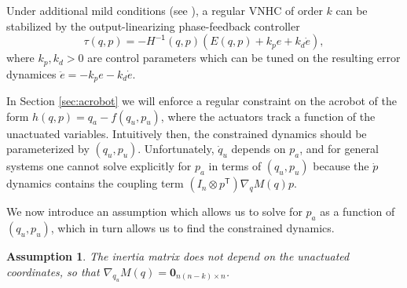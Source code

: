 \documentclass[journal,twoside,web]{ieeecolor}
\newtheorem{assm}{Assumption} %
\newcommand*{\tpose}{^\mathsf{T}}
\newcommand*{\inv}{^\mathsf{-1}}
\newcommand*{\Id}[1]{I_{#1}}
\newcommand*{\Zmat}[1]{\bm{0}_{#1}}
\begin{document}
Under additional mild conditions (see \cite{vhcs_for_el_systems}), a regular VNHC of
order \(k\) can be stabilized by the output-linearizing phase-feedback
controller
\begin{equation}
    \tau(q,p) = -H\inv(q,p)\left(E(q,p) + k_p e + k_d \dot{e}\right)
    ,
\end{equation}
where \(k_p, k_d > 0\) are control parameters which can be tuned on the
resulting error dynamices \(\ddot{e} = -k_p e - k_d \dot{e}\).

In Section \ref{sec:acrobot} we will enforce a regular constraint on the
acrobot of the form \(h(q,p) = q_a - f(q_u,p_u)\), where the actuators track a
function of the unactuated variables.
Intuitively then, the constrained dynamics should be parameterized by \((q_u, p_u)\).
Unfortunately, \(\dot{q}_u\) depends on \(p_a\), and for general systems one
cannot solve explicitly for \(p_a\) in terms of \((q_u,p_u)\) because
the \(\dot{p}\) dynamics contains the coupling term 
\((\Id{n} \otimes p\tpose)\nabla_{q}M(q)p\). 

We now introduce an assumption which allows us to solve for \(p_a\) as a
function of \((q_u,p_u)\), which in turn allows us to find the constrained
dynamics.

\begin{assm}\label{assm:inertially-actuated}
The inertia matrix does not depend on the unactuated coordinates, so that 
\(\nabla_{q_u}M(q) = \Zmat{n(n-k) \times n}\).
\end{assm}
\end{document}

